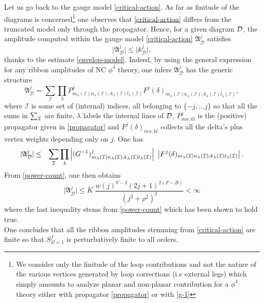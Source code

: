 \documentclass[a4paper,11pt,twoside]{article}
\numberwithin{equation}{section}
\theoremstyle{nonumberplain}
\newcounter{and}
\begin{document}
Let us go back to the gauge model \eqref{critical-action}. As far as finitude of the diagrams is concerned{\footnote{We consider only the finitude of the loop contributions and not the nature of the various vertices generated by loop corrections (i.e external legs) which simply amounts to analyze planar and non-planar contribution for a $\phi^4$ theory either with propagator \eqref{propagator} or with \eqref{g-1}}} one observes that \eqref{critical-action} differs from the truncated model only through the propagator. Hence, for a given diagram ${\cal{D}}$, the amplitude computed within the gauge model \eqref{critical-action} $\mathfrak{A}^j_{\mathcal{D}}$ satisfies 
\begin{equation}
\vert \mathfrak{A}^j_{\mathcal{D}}\vert\le \vert \mathbb{A}^j_{\mathcal{D}}\vert,
\end{equation}
thanks to the estimate \eqref{envelop-model}. Indeed, by using the general expression for any ribbon amplitudes of NC $\phi^4$ theory, one infers $\mathfrak{A}^j_{\mathcal{D}}$ has the generic structure%
%
\begin{equation}
\mathfrak{A}^j_{\mathcal{D}} = \sum_{\mathcal{I}} \prod_\lambda P^j_{m_\lambda(\mathcal{I}) n_\lambda(\mathcal{I});k_\lambda(\mathcal{I}) l_\lambda(\mathcal{I})} F^j(\delta)_{m_\lambda(\mathcal{I}) n_\lambda(\mathcal{I});k_\lambda(\mathcal{I}) l_\lambda(\mathcal{I})},\label{amplit-arb}
\end{equation}
%
where $\mathcal{I}$ is some set of (internal) indices, all belonging to $\{-j,...j\}$ so that all the sums in $\sum_{{\cal{I}}}$ are finite, $\lambda$ labels the internal lines of ${\cal{D}}$, $P^j_{mn;kl}$ is the (positive) propagator given in \eqref{propagator} and $F^j(\delta)_{mn;kl}$ collects all the delta's plus vertex weights depending only on $j$. One has%
%
\begin{eqnarray}
\vert\mathfrak{A}^j_{\mathcal{D}}\vert &\le& \sum_{\mathcal{I}} \prod_\lambda \left|(G^{-1})^j_{m_\lambda(\mathcal{I}) n_\lambda(\mathcal{I}) ; k_\lambda(\mathcal{I}) l_\lambda(\mathcal{I})} \right| \ \left| F^j(\delta)_{m_\lambda({\cal{I}}) n_\lambda({\cal{I}});k_\lambda({\cal{I}}) l_\lambda({\cal{I}})} \right|.
\end{eqnarray}
%
From \eqref{power-count}, one then obtains
\begin{equation}
\vert\mathfrak{A}^j_{\mathcal{D}}\vert \le K^\prime\frac{w(j)^{V-I}(2j+1)^{2(F-B)}}{(j^2+\rho^2)^I}< \infty
\end{equation}
where the last inequality stems from \eqref{power-count} which has been shown to hold true.\\
One concludes that all the ribbon amplitudes stemming from \eqref{critical-action} are finite so that $S^f_{\Omega=1}$ is perturbatively finite to all orders.\par%
\end{document}
